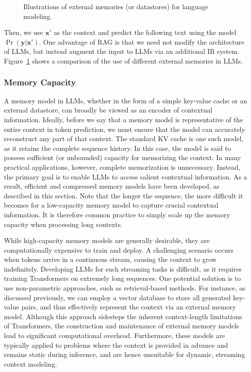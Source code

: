 \begin{figure}[!t]
\centering

\caption{Illustrations of external memories (or datastores) for language modeling.}
\label{fig:comparison-external-memories}
\end{figure}

\noindent Then, we use $\mathbf{x}'$ as the context and predict the following text using the model $\Pr(\mathbf{y}|\mathbf{x}')$. One advantage of RAG is that we need not modify the architecture of LLMs, but instead augment the input to LLMs via an additional IR system. Figure~\ref{fig:comparison-external-memories} shows a comparison of the use of different external memories in LLMs.

\subsubsection{Memory Capacity}

\noindent A memory model in LLMs, whether in the form of a simple key-value cache or an external datastore, can broadly be viewed as an encoder of contextual information. Ideally, before we say that a memory model is representative of the entire context in token prediction, we must ensure that the model can accurately reconstruct any part of that context. The standard KV cache is one such model, as it retains the complete sequence history. In this case, the model is said to possess sufficient (or unbounded) capacity for memorizing the context. In many practical applications, however, complete memorization is unnecessary. Instead, the primary goal is to enable LLMs to access salient contextual information. As a result, efficient and compressed memory models have been developed, as described in this section. Note that the longer the sequence, the more difficult it becomes for a low-capacity memory model to capture crucial contextual information. It is therefore common practice to simply scale up the memory capacity when processing long contexts.

While high-capacity memory models are generally desirable, they are computationally expensive to train and deploy. A challenging scenario occurs when tokens arrive in a continuous stream, causing the context to grow indefinitely. Developing LLMs for such streaming tasks is difficult, as it requires training Transformers on extremely long sequences. One potential solution is to use non-parametric approaches, such as retrieval-based methods. For instance, as discussed previously, we can employ a vector database to store all generated key-value pairs, and thus effectively represent the context via an external memory model. Although this approach sidesteps the inherent context-length limitations of Transformers, the construction and maintenance of external memory models lead to significant computational overhead. Furthermore, these models are typically applied to problems where the context is provided in advance and remains static during inference, and are hence unsuitable for dynamic, streaming context modeling.

